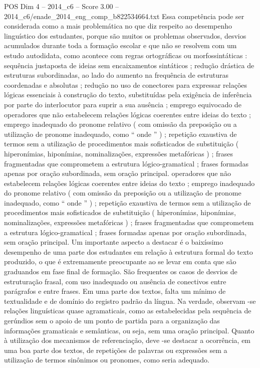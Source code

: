 \begin{textsample}{POS Dim 4 – 2014\_c6 – Score 3.00 – 2014\_c6/enade\_2014\_eng\_comp\_b822534664.txt}
Essa competência pode ser considerada como a mais problemática no que diz respeito ao desempenho linguístico dos estudantes, porque são muitos os problemas observados, desvios acumulados durante toda a formação escolar e que não se resolvem com um estudo autodidata, como acontece com regras ortográficas ou morfossintáticas : sequência justaposta de ideias sem encaixamentos sintáticos ; redução drástica de estruturas subordinadas, ao lado do aumento na frequência de estruturas coordenadas e absolutas ; redução no uso de conectores para expressar relações lógicas essenciais à construção do texto, substituídas pela exigência de inferência por parte do interlocutor para suprir a sua ausência ; emprego equivocado de operadores que não estabelecem relações lógicas coerentes entre ideias do texto ; emprego inadequado do pronome relativo ( com omissão da preposição ou a utilização de pronome inadequado, como “ onde ” ) ; repetição exaustiva de termos sem a utilização de procedimentos mais sofisticados de substituição ( hiperonímias, hiponímias, nominalizações, expressões metafóricas ) ; frases fragmentadas que comprometem a estrutura lógico-gramatical ; frases formadas apenas por oração subordinada, sem oração principal. operadores que não estabelecem relações lógicas coerentes entre ideias do texto ; emprego inadequado do pronome relativo ( com omissão da preposição ou a utilização de pronome inadequado, como “ onde ” ) ; repetição exaustiva de termos sem a utilização de procedimentos mais sofisticados de substituição ( hiperonímias, hiponímias, nominalizações, expressões metafóricas ) ; frases fragmentadas que comprometem a estrutura lógico-gramatical ; frases formadas apenas por oração subordinada, sem oração principal.
Um importante aspecto a destacar é o baixíssimo desempenho de uma parte dos estudantes em relação à estrutura formal do texto produzido, o que é extremamente preocupante ao se levar em conta que são graduandos em fase final de formação.
São frequentes os casos de desvios de estruturação frasal, com uso inadequado ou ausência de conectivos entre parágrafos e entre frases.
Em uma parte dos textos, falta um mínimo de textualidade e de domínio do registro padrão da língua.
Na verdade, observam -se relações linguísticas quase agramaticais, como as estabelecidas pela sequência de gerúndios sem o apoio de um ponto de partida para a organização das informações gramaticais e semânticas, ou seja, sem uma oração principal.
Quanto à utilização dos mecanismos de referenciação, deve -se destacar a ocorrência, em uma boa parte dos textos, de repetições de palavras ou expressões sem a utilização de termos sinônimos ou pronomes, como seria adequado.

\end{textsample}
